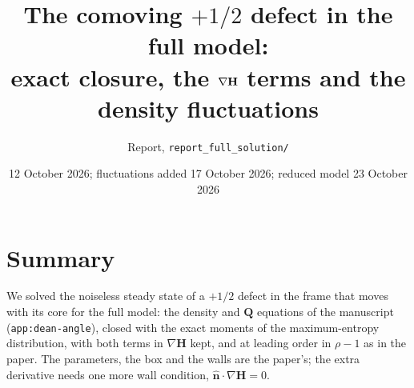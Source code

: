 \documentclass[11pt,a4paper]{article}
\title{The comoving $+1/2$ defect in the full model:\\
exact closure, the $\nabla\H$ terms and the density fluctuations}
\author{Report, \texttt{report\_full\_solution/}}
\date{12 October 2026; fluctuations added 17 October 2026; reduced model 23 October 2026}
\newcommand{\Q}{\mathbf{Q}}
\renewcommand{\H}{\mathbf{H}}
\newcommand{\nh}{\hat{\bm{n}}}
\begin{document}
\maketitle

\section{Summary}
\label{sec:summary}
We solved the noiseless steady state of a $+1/2$ defect in the frame that moves with its core
for the full model: the density and $\Q$ equations of the manuscript (\texttt{app:dean-angle}), closed with
the exact moments of the maximum-entropy distribution, with both terms in $\nabla\H$ kept,
and at leading order in $\rho-1$ as in the paper. The parameters, the box and the walls are
the paper's; the extra derivative needs one more wall condition, $\nh\cdot\nabla\H=0$.
\end{document}
